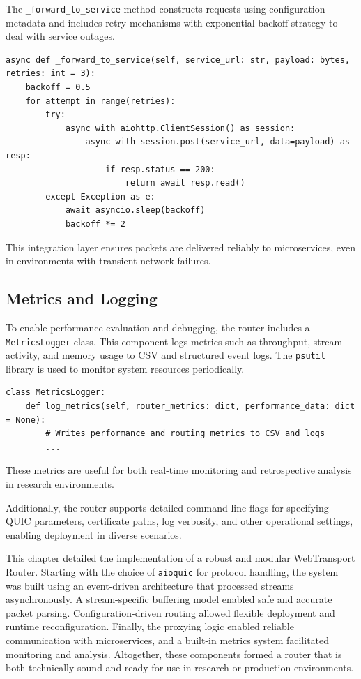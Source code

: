 The \texttt{\_forward\_to\_service} method constructs requests using configuration metadata and includes retry mechanisms with exponential backoff strategy to deal with service outages.

\begin{lstlisting}[breaklines=true,basicstyle=\small\ttfamily,frame=single]
async def _forward_to_service(self, service_url: str, payload: bytes, retries: int = 3):
    backoff = 0.5
    for attempt in range(retries):
        try:
            async with aiohttp.ClientSession() as session:
                async with session.post(service_url, data=payload) as resp:
                    if resp.status == 200:
                        return await resp.read()
        except Exception as e:
            await asyncio.sleep(backoff)
            backoff *= 2
\end{lstlisting}

This integration layer ensures packets are delivered reliably to microservices, even in environments with transient network failures.

\subsection{Metrics and Logging}

To enable performance evaluation and debugging, the router includes a \texttt{MetricsLogger} class. This component logs metrics such as throughput, stream activity, and memory usage to CSV and structured event logs. The \texttt{psutil} library is used to monitor system resources periodically.

\begin{lstlisting}[breaklines=true,basicstyle=\small\ttfamily,frame=single]
class MetricsLogger:
    def log_metrics(self, router_metrics: dict, performance_data: dict = None):
        # Writes performance and routing metrics to CSV and logs
        ...
\end{lstlisting}

These metrics are useful for both real-time monitoring and retrospective analysis in research environments.

Additionally, the router supports detailed command-line flags for specifying QUIC parameters, certificate paths, log verbosity, and other operational settings, enabling deployment in diverse scenarios.


This chapter detailed the implementation of a robust and modular WebTransport Router. Starting with the choice of \texttt{aioquic} for protocol handling, the system was built using an event-driven architecture that processed streams asynchronously. A stream-specific buffering model enabled safe and accurate packet parsing. Configuration-driven routing allowed flexible deployment and runtime reconfiguration. Finally, the proxying logic enabled reliable communication with microservices, and a built-in metrics system facilitated monitoring and analysis. Altogether, these components formed a router that is both technically sound and ready for use in research or production environments.




